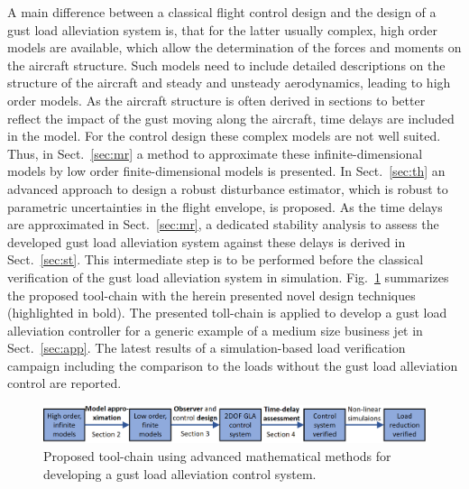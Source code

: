 \documentclass[graybox]{svmult}
\begin{document}
A main difference between a classical flight control design and the design of a gust load alleviation system is, that for the latter usually complex, high order models are available, which allow the determination of the forces and moments on the  aircraft structure. Such models need to include detailed descriptions on the structure of the aircraft and steady and unsteady aerodynamics, leading to high order models. As the aircraft structure is often derived in sections to better reflect the impact of the gust moving along the aircraft, time delays are included in the model. For the control design these complex models are not well suited. Thus, in Sect.~\ref{sec:mr} a method to approximate  these infinite-dimensional models by low order finite-dimensional models is presented. In Sect.~\ref{sec:th} an advanced approach to design a robust disturbance estimator, which is robust to parametric uncertainties in the flight envelope, is proposed.
As the time delays are approximated in Sect.~\ref{sec:mr}, a dedicated stability analysis to assess the developed gust load alleviation system against these delays is derived in Sect.~\ref{sec:st}. This intermediate step is to be performed before the classical verification of the gust load alleviation system in simulation. Fig.~\ref{fig:toolchain} summarizes the proposed  tool-chain  with the  herein presented novel design techniques (highlighted in bold).  The presented toll-chain is applied to develop a gust load alleviation controller for a generic example of a medium size business jet in Sect.~\ref{sec:app}. The latest  results of a simulation-based load verification campaign including the comparison to  the loads  without  the gust load alleviation control are reported.
\begin{figure}[bth]
	\centering
		\includegraphics[width=1\textwidth]{strct.png}
	\caption{Proposed tool-chain using advanced mathematical methods for developing a gust load alleviation control system.}
	\label{fig:toolchain}	
\end{figure}
\end{document}
